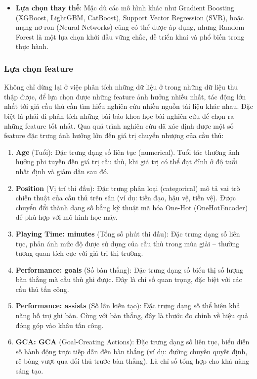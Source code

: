 \documentclass[12pt]{report}
\begin{document}
{\begin{itemize}
    \item \textbf{Lựa chọn thay thế}: Mặc dù các mô hình khác như Gradient Boosting (XGBoost, LightGBM, CatBoost), Support Vector Regression (SVR), hoặc mạng nơ-ron (Neural Networks) cũng có thể được áp dụng, nhưng Random Forest là một lựa chọn khởi đầu vững chắc, dễ triển khai và phổ biến trong thực hành.
\end{itemize}
\subsubsection{Lựa chọn feature}
Không chỉ dừng lại ở việc phân tích những dữ liệu ở trong những dữ liệu thu thập được, để lựa chọn được những feature ảnh hưởng nhiều nhất, tác động lớn nhất tới giá cầu thủ cần tìm hiểu nghiên cứu nhiều nguồn tài liệu khác nhau. Đặc biệt là phải đi phân tích những bài báo khoa học bài nghiên cứu để chọn ra những feature tốt nhất. Qua quá trình nghiên cứu đã xác định được một số feature đặc trưng ảnh hưởng lớn đến giá trị chuyển nhượng của cầu thủ:
\begin{enumerate}
    \item \textbf{Age} (Tuổi): Đặc trưng dạng số liên tục (numerical). Tuổi tác thường ảnh hưởng phi tuyến đến giá trị cầu thủ, khi giá trị có thể đạt đỉnh ở độ tuổi nhất định và giảm dần sau đó.
    
    \item \textbf{Position} (Vị trí thi đấu): Đặc trưng phân loại (categorical) mô tả vai trò chiến thuật của cầu thủ trên sân (ví dụ: tiền đạo, hậu vệ, tiền vệ). Được chuyển đổi thành dạng số bằng kỹ thuật mã hóa One-Hot (OneHotEncoder) để phù hợp với mô hình học máy.
    
    \item \textbf{Playing Time: minutes} (Tổng số phút thi đấu): Đặc trưng dạng số liên tục, phản ánh mức độ được sử dụng của cầu thủ trong mùa giải – thường tương quan tích cực với giá trị thị trường.
    
    \item \textbf{Performance: goals} (Số bàn thắng): Đặc trưng dạng số biểu thị số lượng bàn thắng mà cầu thủ ghi được. Đây là chỉ số quan trọng, đặc biệt với các cầu thủ tấn công.
    
    \item \textbf{Performance: assists} (Số lần kiến tạo): Đặc trưng dạng số thể hiện khả năng hỗ trợ ghi bàn. Cùng với bàn thắng, đây là thước đo chính về hiệu quả đóng góp vào khâu tấn công.
    
    \item \textbf{GCA: GCA} (Goal-Creating Actions): Đặc trưng dạng số liên tục, biểu diễn số hành động trực tiếp dẫn đến bàn thắng (ví dụ: đường chuyền quyết định, rê bóng vượt qua đối thủ trước bàn thắng). Là chỉ số tổng hợp cho khả năng sáng tạo.
    

\end{enumerate}}
\end{document}
